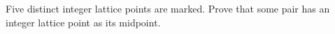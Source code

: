 Five distinct integer lattice points are marked. Prove that some pair has an integer lattice point as its midpoint.
